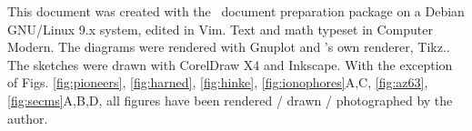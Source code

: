\newpage
This document was created with the \LaTeXe \, document preparation package on a Debian GNU/Linux 9.x system, edited in Vim. Text and math typeset in Computer Modern.
The diagrams were rendered with Gnuplot and \LaTeXe's  own renderer, Tikz..
The sketches were drawn with CorelDraw X4 and Inkscape.
With the exception of Figs. \ref{fig:pioneers}, \ref{fig:harned}, \ref{fig:hinke}, \ref{fig:ionophores}A,C, \ref{fig:az63}, \ref{fig:secms}A,B,D, all figures have been rendered / drawn / photographed by the author.
